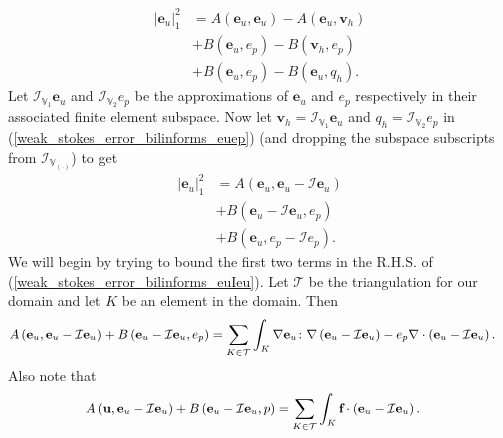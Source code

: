 \documentclass{article}
\begin{document}
\begin{equation} \label{weak_stokes_error_bilinforms_euep}
\begin{aligned}
\left|\textbf{e}_u\right|^2_1 &=A\left(\textbf{e}_u,\textbf{e}_u\right)-A\left(\textbf{e}_u,\textbf{v}_h\right)\\
&+B\left(\textbf{e}_u,e_p\right)-B\left(\textbf{v}_h,e_p\right)\\
&+B\left(\textbf{e}_u,e_p\right)-B\left(\textbf{e}_u,q_h\right).
\end{aligned}
\end{equation}
Let $\mathcal{I}_{\mathbb{V}_1}\textbf{e}_u$ and $\mathcal{I}_{\mathbb{V}_2}e_p$ be the approximations of $\textbf{e}_u$ and $e_p$  respectively in their associated finite element subspace.  Now let $\textbf{v}_h= \mathcal{I}_{\mathbb{V}_1}\textbf{e}_u$  and $q_h=\mathcal{I}_{\mathbb{V}_2}e_p$ in (\ref{weak_stokes_error_bilinforms_euep}) (and dropping the subspace subscripts from $\mathcal{I}_{\mathbb{V}_{\left(\cdot\right)}}$) to get 
\begin{equation} \label{weak_stokes_error_bilinforms_euIeu}
\begin{aligned}
\left|\textbf{e}_u\right|^2_1 &=A\left(\textbf{e}_u,\textbf{e}_u-\mathcal{I}\textbf{e}_u\right)\\
&+B\left(\textbf{e}_u-\mathcal{I}\textbf{e}_u,e_p\right)\\
&+B\left(\textbf{e}_u,e_p-\mathcal{I}e_p\right).
\end{aligned}
\end{equation}
We will begin by trying to bound the first two terms in the R.H.S. of (\ref{weak_stokes_error_bilinforms_euIeu}).  Let $\mathcal{T}$ be the triangulation for our domain and let $K$ be an element in the domain. Then
\begin{equation} \small \label{weak_stokes_error_firsttwo}
\begin{aligned}
A\left(\textbf{e}_u,\textbf{e}_u-\mathcal{I}\textbf{e}_u\right)
+B\left(\textbf{e}_u-\mathcal{I}\textbf{e}_u,e_p\right)&= \sum_{K\in\mathcal{T}}\int_{K}\nabla\textbf{e}_u\colon\nabla\left(\textbf{e}_u-\mathcal{I}\textbf{e}_u\right)- e_p\nabla\cdot\left(\textbf{e}_u-\mathcal{I}\textbf{e}_u\right).
\end{aligned}
\end{equation}
Also note that
\begin{equation} \small
\begin{aligned}
A\left(\textbf{u},\textbf{e}_u-\mathcal{I}\textbf{e}_u\right)
+B\left(\textbf{e}_u-\mathcal{I}\textbf{e}_u,p\right)&= \sum_{K\in\mathcal{T}}\int_{K}\textbf{f}\cdot\left(\textbf{e}_u-\mathcal{I}\textbf{e}_u\right).
\end{aligned}
\end{equation}
\end{document}
